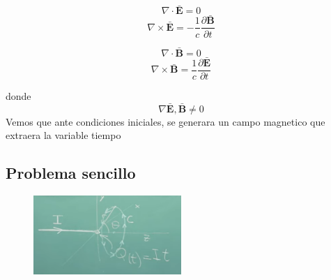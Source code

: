 \documentclass{article}
\begin{document}
	\begin{minipage}{.5\textwidth}
		\begin{equation*}
			\nabla \cdot \mathbf{\bar{E}} = 0
		\end{equation*}
		\begin{equation*}
			\nabla \times \mathbf{\bar{E}} = -\frac{1}{c} \frac{\partial \mathbf{\bar{B}}}{\partial t}
		\end{equation*}
	\end{minipage}   
	\begin{minipage}{.5\textwidth}
		\begin{equation*}
			\nabla \cdot \mathbf{\bar{B}} = 0
		\end{equation*}
		\begin{equation*}
			\nabla \times \mathbf{\bar{B}} = \frac{1}{c} \frac{\partial \mathbf{\bar{E}}}{\partial t}
		\end{equation*}
	\end{minipage}
	donde
	\begin{equation*}
		\nabla \mathbf{\bar{E}},\mathbf{\bar{B}}\neq0
	\end{equation*}
	Vemos que ante condiciones iniciales, se generara un campo magnetico que extraera la variable tiempo
	\subsection{Problema sencillo}
	
	\begin{figure}[h!]
		\centering
		\includegraphics[width=0.5\textwidth]{imagen.png}  
		\label{fig:mi_imagen}
	\end{figure}
	
\end{document}
